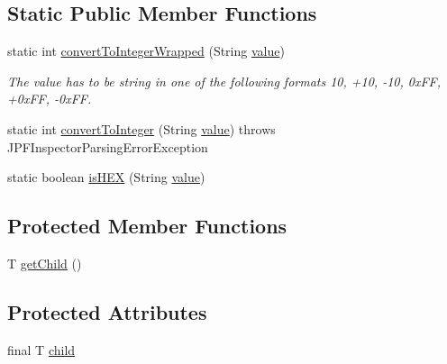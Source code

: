\subsection*{Static Public Member Functions}
\begin{DoxyCompactItemize}
\item 
static int \hyperlink{classgov_1_1nasa_1_1jpf_1_1inspector_1_1server_1_1expression_1_1expressions_1_1_expression_state_value_const_integer_aa1c72b2efb80ad1fcc49e56ba0c570c7}{convert\+To\+Integer\+Wrapped} (String \hyperlink{classgov_1_1nasa_1_1jpf_1_1inspector_1_1server_1_1expression_1_1expressions_1_1_expression_state_value_const_integer_a17498ef8a0993ee14ae829c5aaf420b6}{value})
\begin{DoxyCompactList}\small\item\em The value has to be string in one of the following formats 10, +10, -\/10, 0x\+FF, +0x\+FF, -\/0x\+FF. \end{DoxyCompactList}\item 
static int \hyperlink{classgov_1_1nasa_1_1jpf_1_1inspector_1_1server_1_1expression_1_1expressions_1_1_expression_state_value_const_integer_aff854f872ad847871eefa6c91342b7b0}{convert\+To\+Integer} (String \hyperlink{classgov_1_1nasa_1_1jpf_1_1inspector_1_1server_1_1expression_1_1expressions_1_1_expression_state_value_const_integer_a17498ef8a0993ee14ae829c5aaf420b6}{value})  throws J\+P\+F\+Inspector\+Parsing\+Error\+Exception 
\item 
static boolean \hyperlink{classgov_1_1nasa_1_1jpf_1_1inspector_1_1server_1_1expression_1_1expressions_1_1_expression_state_value_const_integer_aa6e13764893297b86baee31938f2066d}{is\+H\+EX} (String \hyperlink{classgov_1_1nasa_1_1jpf_1_1inspector_1_1server_1_1expression_1_1expressions_1_1_expression_state_value_const_integer_a17498ef8a0993ee14ae829c5aaf420b6}{value})
\end{DoxyCompactItemize}
\subsection*{Protected Member Functions}
\begin{DoxyCompactItemize}
\item 
T \hyperlink{classgov_1_1nasa_1_1jpf_1_1inspector_1_1server_1_1expression_1_1_expression_state_unary_operator_a150bac338d6557f79ca185d3f6ad6e06}{get\+Child} ()
\end{DoxyCompactItemize}
\subsection*{Protected Attributes}
\begin{DoxyCompactItemize}
\item 
final T \hyperlink{classgov_1_1nasa_1_1jpf_1_1inspector_1_1server_1_1expression_1_1_expression_state_unary_operator_a66041b1f569a361549e28a00f7ca5f2f}{child}
\end{DoxyCompactItemize}
